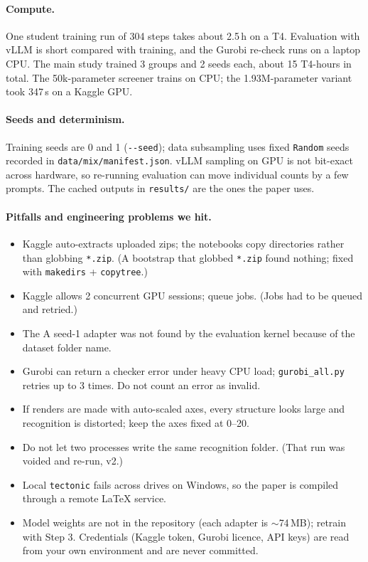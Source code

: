 \paragraph{Compute.} One student training run of 304 steps takes about 2.5\,h on a T4. Evaluation with vLLM is short compared with training, and the Gurobi re-check runs on a laptop CPU. The main study trained 3 groups and 2 seeds each, about 15 T4-hours in total. The 50k-parameter screener trains on CPU; the 1.93M-parameter variant took 347\,s on a Kaggle GPU.

\paragraph{Seeds and determinism.} Training seeds are 0 and 1 (\texttt{-{}-seed}); data subsampling uses fixed \texttt{Random} seeds recorded in \texttt{data/mix/manifest.json}. vLLM sampling on GPU is not bit-exact across hardware, so re-running evaluation can move individual counts by a few prompts. The cached outputs in \texttt{results/} are the ones the paper uses.

\paragraph{Pitfalls and engineering problems we hit.}
\begin{itemize}\itemsep0pt
\item Kaggle auto-extracts uploaded zips; the notebooks copy directories rather than globbing \texttt{*.zip}. (A bootstrap that globbed \texttt{*.zip} found nothing; fixed with \texttt{makedirs} + \texttt{copytree}.)
\item Kaggle allows 2 concurrent GPU sessions; queue jobs. (Jobs had to be queued and retried.)
\item The A seed-1 adapter was not found by the evaluation kernel because of the dataset folder name.
\item Gurobi can return a checker error under heavy CPU load; \texttt{gurobi\_all.py} retries up to 3 times. Do not count an error as invalid.
\item If renders are made with auto-scaled axes, every structure looks large and recognition is distorted; keep the axes fixed at 0--20.
\item Do not let two processes write the same recognition folder. (That run was voided and re-run, v2.)
\item Local \texttt{tectonic} fails across drives on Windows, so the paper is compiled through a remote \LaTeX{} service.
\item Model weights are not in the repository (each adapter is $\sim$74\,MB); retrain with Step 3. Credentials (Kaggle token, Gurobi licence, API keys) are read from your own environment and are never committed.
\end{itemize}
